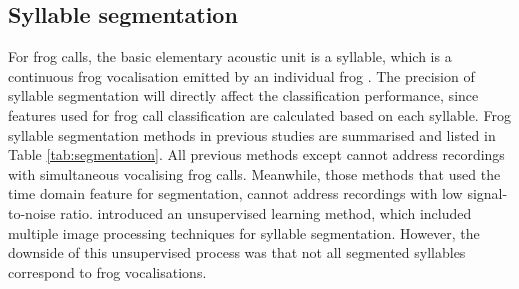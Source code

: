 \subsection{Syllable segmentation}
For frog calls, the basic elementary acoustic unit is a syllable, which is a continuous frog vocalisation emitted by an individual frog \citep{huang2009frog}. The precision of syllable segmentation will directly affect the classification performance, since features used for frog call classification are calculated based on each syllable. Frog syllable segmentation methods in previous studies are summarised and listed in Table \ref{tab:segmentation}. All previous methods except \citep{jie2015ICIP} cannot address recordings with simultaneous vocalising frog calls. Meanwhile, those methods that used the time domain feature for segmentation, cannot address recordings with low signal-to-noise ratio. \cite{jie2015ICIP} introduced an unsupervised learning method, which included multiple image processing techniques for syllable segmentation. However, the downside of this unsupervised process was that not all segmented syllables correspond to frog vocalisations.

  
\begin{table}[htb!]
\centering
\caption[Summary of related work]{Summary of related work for frog syllable segmentation. Here, E denotes energy, ZCR denotes zero-crossing rate.}
\label{tab:segmentation}
\end{table}




